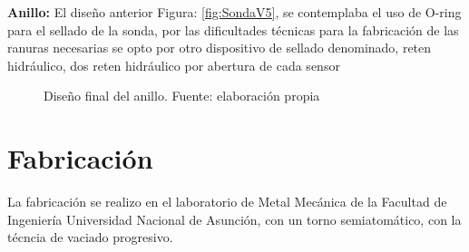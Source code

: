 \textbf{Anillo: }
El diseño anterior Figura: \ref{fig:SondaV5}, se contemplaba el uso de O-ring para el sellado de la sonda, por las dificultades t\'ecnicas para la fabricaci\'on de las ranuras necesarias se opto por otro dispositivo de sellado denominado,  reten hidr\'aulico, dos reten hidr\'aulico por abertura de cada sensor
\\
\begin{figure}[h]
\centering
{}
\caption{Dise\~no final del anillo. Fuente: elaboración propia}
\label{fig:Anillo2019}
\end{figure}


\section{Fabricaci\'on}
La fabricación se realizo en el laboratorio de Metal Mec\'anica de la Facultad de Ingenier\'ia Universidad Nacional de Asunción, con un torno semiatom\'atico, con la t\'ecncia de vaciado progresivo. 
 
